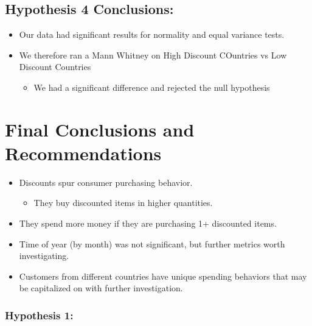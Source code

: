 \documentclass[11pt]{article}
\providecommand{\tightlist}{%
      \setlength{\itemsep}{0pt}\setlength{\parskip}{0pt}}
\begin{document}
    
    \hypertarget{hypothesis-4-conclusions}{%
\subsection{Hypothesis 4 Conclusions:}\label{hypothesis-4-conclusions}}

\begin{itemize}
\tightlist
\item
  Our data had significant results for normality and equal variance
  tests.
\item
  We therefore ran a Mann Whitney on High Discount COuntries vs Low
  Discount Countries

  \begin{itemize}
  \tightlist
  \item
    We had a significant difference and rejected the null hypothesis
  \end{itemize}
\end{itemize}

    \hypertarget{final-conclusions-and-recommendations}{%
\section{Final Conclusions and
Recommendations}\label{final-conclusions-and-recommendations}}

    \begin{itemize}
\tightlist
\item
  Discounts spur consumer purchasing behavior.

  \begin{itemize}
  \tightlist
  \item
    They buy discounted items in higher quantities.
  \end{itemize}
\item
  They spend more money if they are purchasing 1+ discounted items.
\item
  Time of year (by month) was not significant, but further metrics worth
  investigating.
\item
  Customers from different countries have unique spending behaviors that
  may be capitalized on with further investigation.
\end{itemize}

    \hypertarget{hypothesis-1}{%
\subsubsection{Hypothesis 1:}\label{hypothesis-1}}
\end{document}
